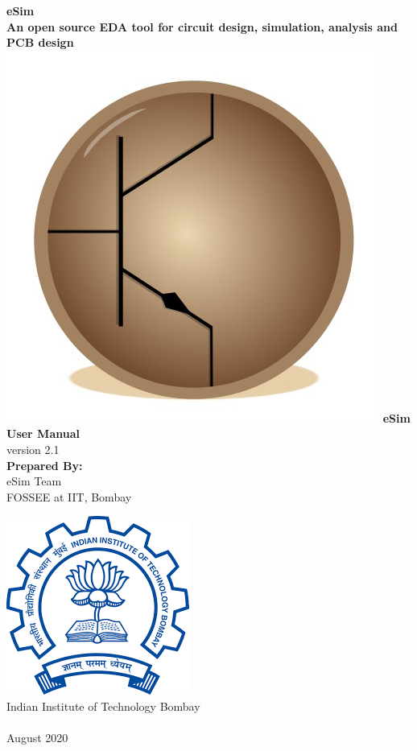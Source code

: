 \begin{center}
{\bf {\Huge eSim} \\ [0.1in]
\LARGE An open source EDA tool for circuit design,
  simulation, analysis and PCB design} \\
\vfill
\includegraphics[width=0.3\linewidth]{logo-trimmed.png}
\vfill
\LARGE \textbf{eSim User Manual} \\ 
\small{version 2.1}\\
\vspace{1cm}
\textbf{Prepared By:}\\
eSim Team\\
FOSSEE at IIT, Bombay

\vspace{1cm}
\includegraphics[width=0.2\linewidth]{iitblogo.png} \\
Indian Institute of Technology Bombay \\ [2mm]
{\LARGE \byncnd} \\ [1mm]
August 2020
\end{center}



\cleardoublepage
